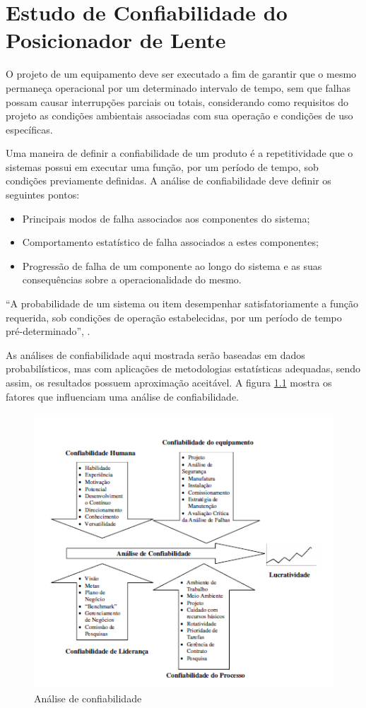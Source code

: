 
\chapter[Estudo de Confiabilidade do Posicionador de Lente]{Estudo de Confiabilidade do Posicionador de Lente}

O projeto de um equipamento deve ser executado a fim de garantir que o mesmo permaneça operacional por um determinado intervalo de tempo, sem que falhas possam causar interrupções parciais ou totais, considerando como requisitos do projeto as condições ambientais associadas com sua operação e condições de uso específicas.

Uma maneira de definir a confiabilidade de um produto é a repetitividade que o sistemas possui em executar uma função, por um período de tempo, sob condições previamente definidas. A análise de confiabilidade deve definir os seguintes pontos:
\begin{itemize}
\item Principais modos de falha associados aos componentes do sistema;
\item Comportamento estatístico de falha associados a estes componentes;
\item Progressão de falha de um componente ao longo do sistema e as suas consequências sobre a operacionalidade do mesmo.
\end{itemize}

“A probabilidade de um sistema ou item desempenhar satisfatoriamente a função requerida, sob condições de operação estabelecidas, por um período de tempo pré-determinado”, \cite{lewis}.

As análises de confiabilidade aqui mostrada serão baseadas em dados probabilísticos, mas com aplicações de metodologias estatísticas adequadas, sendo assim, os resultados possuem aproximação aceitável. A figura \ref{confiabilidade} mostra os fatores que influenciam uma análise de confiabilidade.

\begin{figure}[htb]
		\centering
			\includegraphics[scale=1.0]{figuras/confiabilidade.png}
		\caption{Análise de confiabilidade}
		\label{confiabilidade}
\end{figure}

